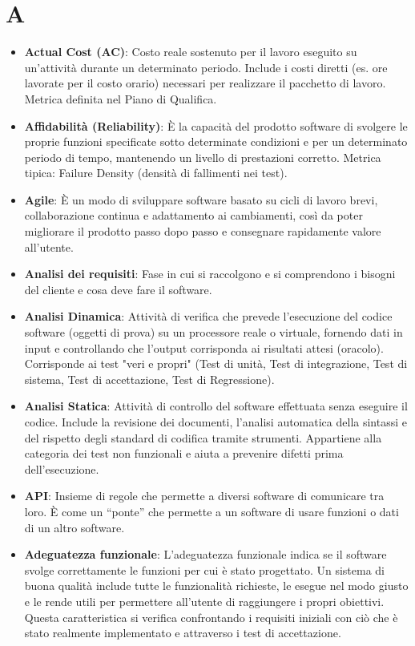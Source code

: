 \documentclass[11pt,a4paper]{article}
\begin{document}
\section*{A}
\begin{itemize}
\item \textbf{Actual Cost (AC)}: Costo reale sostenuto per il lavoro eseguito su un'attività durante un determinato periodo. Include i costi diretti (es. ore lavorate per il costo orario) necessari per realizzare il pacchetto di lavoro. Metrica definita nel Piano di Qualifica.

\item \textbf{Affidabilità (Reliability)}: È la capacità del prodotto software di svolgere le proprie funzioni specificate sotto determinate condizioni e per un determinato periodo di tempo, mantenendo un livello di prestazioni corretto.
Metrica tipica: Failure Density (densità di fallimenti nei test).

\item \textbf{Agile}: È un modo di sviluppare software basato su cicli di lavoro brevi, collaborazione continua e adattamento ai cambiamenti, così da poter migliorare il prodotto passo dopo passo e consegnare rapidamente valore all’utente.

\item \textbf{Analisi dei requisiti}: Fase in cui si raccolgono e si comprendono i bisogni del cliente e cosa deve fare il software.

\item \textbf{Analisi Dinamica}: Attività di verifica che prevede l'esecuzione del codice software (oggetti di prova) su un processore reale o virtuale, fornendo dati in input e controllando che l'output corrisponda ai risultati attesi (oracolo). Corrisponde ai test "veri e propri" (Test di unità, Test di integrazione, Test di sistema, Test di accettazione, Test di Regressione).

\item \textbf{Analisi Statica}: Attività di controllo del software effettuata senza eseguire il codice. Include la revisione dei documenti, l'analisi automatica della sintassi e del rispetto degli standard di codifica tramite strumenti. Appartiene alla categoria dei test non funzionali e aiuta a prevenire difetti prima dell'esecuzione.

\item \textbf{API}: Insieme di regole che permette a diversi software di comunicare tra loro. È come un “ponte” che permette a un software di usare funzioni o dati di un altro software.

\item \textbf{Adeguatezza funzionale}: L’adeguatezza funzionale indica se il software svolge correttamente le funzioni per cui è stato progettato. Un sistema di buona qualità include tutte le funzionalità richieste, le esegue nel modo giusto e le rende utili per permettere all’utente di raggiungere i propri obiettivi. Questa caratteristica si verifica confrontando i requisiti iniziali con ciò che è stato realmente implementato e attraverso i test di accettazione.


\end{itemize}
\newpage
\end{document}
